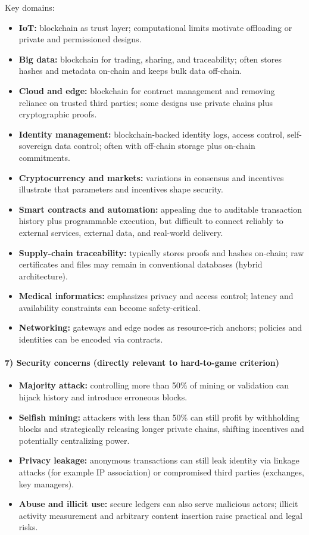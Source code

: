 \documentclass[11pt,a4paper]{article}
\begin{document}
Key domains:
\begin{itemize}[leftmargin=*]
  \item \textbf{IoT:} blockchain as trust layer; computational limits motivate offloading or private and permissioned designs.
  \item \textbf{Big data:} blockchain for trading, sharing, and traceability; often stores hashes and metadata on-chain and keeps bulk data off-chain.
  \item \textbf{Cloud and edge:} blockchain for contract management and removing reliance on trusted third parties; some designs use private chains plus cryptographic proofs.
  \item \textbf{Identity management:} blockchain-backed identity logs, access control, self-sovereign data control; often with off-chain storage plus on-chain commitments.
  \item \textbf{Cryptocurrency and markets:} variations in consensus and incentives illustrate that parameters and incentives shape security.
  \item \textbf{Smart contracts and automation:} appealing due to auditable transaction history plus programmable execution, but difficult to connect reliably to external services, external data, and real-world delivery.
  \item \textbf{Supply-chain traceability:} typically stores proofs and hashes on-chain; raw certificates and files may remain in conventional databases (hybrid architecture).
  \item \textbf{Medical informatics:} emphasizes privacy and access control; latency and availability constraints can become safety-critical.
  \item \textbf{Networking:} gateways and edge nodes as resource-rich anchors; policies and identities can be encoded via contracts.
\end{itemize}

\paragraph{7) Security concerns (directly relevant to hard-to-game criterion)}
\begin{itemize}[leftmargin=*]
  \item \textbf{Majority attack:} controlling more than 50\% of mining or validation can hijack history and introduce erroneous blocks.
  \item \textbf{Selfish mining:} attackers with less than 50\% can still profit by withholding blocks and strategically releasing longer private chains, shifting incentives and potentially centralizing power.
  \item \textbf{Privacy leakage:} anonymous transactions can still leak identity via linkage attacks (for example IP association) or compromised third parties (exchanges, key managers).
  \item \textbf{Abuse and illicit use:} secure ledgers can also serve malicious actors; illicit activity measurement and arbitrary content insertion raise practical and legal risks.
\end{itemize}
\end{document}

